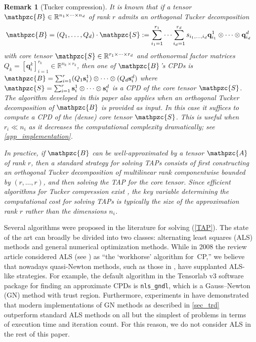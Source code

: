 \documentclass[a4paper,10pt,final]{siamart1116}
\newcommand{\tensor}[1]{\mathpzc{#1}}
\newcommand{\vect}[1]{\mathbf{#1}}
\newcommand{\sten}[3]{\vect{#1}_{#2}^{#3}}
\newcommand{\R}{\mathbb{R}}
\newcommand{\refeqn}[1]{{(\ref{#1})}}
\newcommand{\refsec}[1]{{\cref{#1}}}
\newcommand{\refapp}[1]{{\cref{#1}}}
\newtheorem{remark}[theorem]{Remark}
\numberwithin{equation}{section}
\numberwithin{figure}{section}
\numberwithin{table}{section}
\numberwithin{theorem}{section}
\begin{document}
\begin{remark}[Tucker compression] \label{rem_tucker_compression}
It is known that if a tensor $\tensor{B} \in \R^{n_1 \times \cdots \times n_d}$ of rank $r$ admits an orthogonal Tucker decomposition \cite{Tucker1966}
\[
\tensor{B} = (Q_1, \ldots, Q_d) \cdot \tensor{S} := \sum_{i_1=1}^{r_1} \cdots \sum_{i_d=1}^{r_d} s_{i_1, \ldots, i_d} \sten{q}{i_1}{1} \otimes \cdots \otimes \sten{q}{i_d}{d}
\]
with core tensor $\tensor{S} \in \R^{r_1 \times \cdots \times r_d}$ and orthonormal factor matrices $Q_k = [\sten{q}{i}{k}]_{i=1}^{r_k} \in \R^{n_k \times r_k}$, then one of $\tensor{B}$'s CPDs is $\tensor{B} = \sum_{i=1}^r (Q_1 \sten{s}{i}{1}) \otimes \cdots \otimes (Q_d \sten{s}{i}{d})$ where $\tensor{S} = \sum_{i=1}^r \sten{s}{i}{1} \otimes \cdots \otimes \sten{s}{i}{d}$ is a CPD of the core tensor $\tensor{S}$. The algorithm developed in this paper also applies when an orthogonal Tucker decomposition of $\tensor{B}$ is provided as input. In this case it suffices to compute a CPD of the (dense) core tensor $\tensor{S}$. This is useful when $r_i \ll n_i$ as it decreases the computational complexity dramatically; see \refapp{app_implementation}.

In practice, if $\tensor{B}$ can be well-approximated by a tensor $\tensor{A}$ of rank $r$, then a standard strategy for solving TAPs consists of first constructing an orthogonal Tucker decomposition of multilinear rank componentwise bounded by $(r, \ldots, r)$, and then solving the TAP for the core tensor. Since efficient algorithms for Tucker compression exist \cite{OST2008,DM2007,CC2010,Saibaba2016}, the key variable determining the computational cost for solving TAPs is typically the size of the approximation rank $r$ rather than the dimensions $n_i$.
\end{remark}

Several algorithms were proposed in the literature for solving \refeqn{TAP}. The state of the art can broadly be divided into two classes: alternating least squares (ALS) methods and general numerical optimization methods.
While in 2008 the review article \cite{KB2009} considered ALS (see \cite{Harshman1970,Caroll1970,CHLZ2012}) as ``the `workhorse' algorithm for~CP,'' we believe that nowadays quasi-Newton methods, such as those in \cite{Acar2011,Hayashi1982,Paatero1999,Paatero1997,Phan2013a,Sorber2013a,Tomasi2006,dSM2013}, have supplanted ALS-like strategies. For example, the default algorithm in the Tensorlab v3 software package \cite{Tensorlab} for finding an approximate CPDs is \texttt{nls\_gndl}, which is a Gauss--Newton (GN) method with trust region.
Furthermore, experiments in \cite{Acar2011,Sorber2013a,Phan2013a,Tomasi2006} have demonstrated that modern implementations of GN methods as described in \refsec{sec_trd} outperform standard ALS methods on all but the simplest of problems in terms of execution time and iteration count. For this reason, we do not consider ALS in the rest of this paper.
\end{document}
